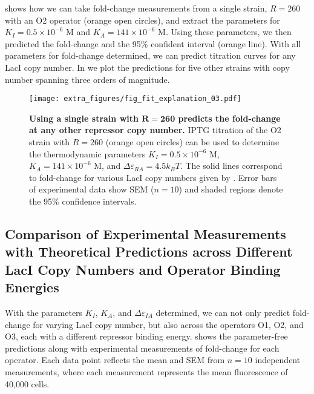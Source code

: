  shows how we can take fold-change measurements from a single strain, $R=260$ with an O2 operator (orange open circles), and extract the parameters for $K_I=0.5 \times 10^{-6} \,\, \text{M}$ and $K_A=141 \times 10^{-6} \,\, \text{M}$. Using these parameters, we then predicted the fold-change \eref[eq7] and the 95\% confident interval (orange line). With all parameters for fold-change  determined, we can predict titration curves for any LacI copy number. In  we plot the predictions for five other strains with copy number spanning three orders of magnitude.

\begin{figure}[h]
	\centering \texttt{[image: extra\_figures/fig\_fit\_explanation\_03.pdf]}
	\caption{{\bf Using a single strain with $\boldsymbol{R=260}$ predicts the fold-change at any other repressor copy number.} IPTG titration of the O2 strain with $R=260$ (orange open circles) can be used to determine the thermodynamic parameters $K_I=0.5 \times 10^{-6} \,\, \text{M}$, $K_A=141 \times 10^{-6} \,\, \text{M}$, and $\Delta \varepsilon_{RA}=4.5 k_B T$. The solid lines correspond to fold-change for various LacI copy numbers given by \eref[eq7]. Error bars of experimental data show SEM ($n=10$) and shaded regions denote the 95\% confidence intervals.} \label{fig_result1}
\end{figure}

\subsection*{Comparison of Experimental Measurements with Theoretical Predictions across Different LacI Copy Numbers and Operator Binding Energies}

With the parameters $K_I$, $K_A$, and $\Delta\varepsilon_{IA}$ determined, we can not only predict fold-change for varying LacI copy number, but also across the operators O1, O2, and O3, each with a different repressor binding energy.  shows the parameter-free predictions along with experimental measurements of fold-change for each operator. Each data point reflects the mean and SEM from $n=10$ independent measurements, where each measurement represents the mean fluorescence of 40,000 cells.

